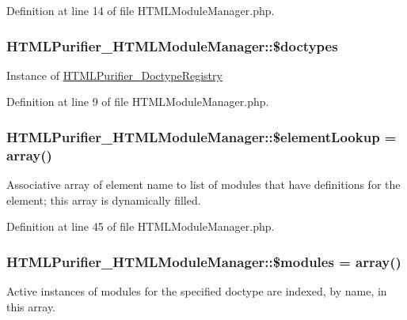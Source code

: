 Definition at line 14 of file H\+T\+M\+L\+Module\+Manager.\+php.

\hypertarget{classHTMLPurifier__HTMLModuleManager_a94b1b82d8a2873995d6f0e7348e960d0}{
\subsubsection[{\$doctypes}]{\setlength{\rightskip}{0pt plus 5cm}H\+T\+M\+L\+Purifier\+\_\+\+H\+T\+M\+L\+Module\+Manager\+::\$doctypes}}\label{classHTMLPurifier__HTMLModuleManager_a94b1b82d8a2873995d6f0e7348e960d0}
Instance of \hyperlink{classHTMLPurifier__DoctypeRegistry}{H\+T\+M\+L\+Purifier\+\_\+\+Doctype\+Registry} 

Definition at line 9 of file H\+T\+M\+L\+Module\+Manager.\+php.

\hypertarget{classHTMLPurifier__HTMLModuleManager_a9e6c47d3f347bb0d09116b4ac5fce29e}{
\subsubsection[{\$element\+Lookup}]{\setlength{\rightskip}{0pt plus 5cm}H\+T\+M\+L\+Purifier\+\_\+\+H\+T\+M\+L\+Module\+Manager\+::\$element\+Lookup = array()}}\label{classHTMLPurifier__HTMLModuleManager_a9e6c47d3f347bb0d09116b4ac5fce29e}
Associative array of element name to list of modules that have definitions for the element; this array is dynamically filled. 

Definition at line 45 of file H\+T\+M\+L\+Module\+Manager.\+php.

\hypertarget{classHTMLPurifier__HTMLModuleManager_a1dad6984fd384aa80f545c0323e8b18f}{
\subsubsection[{\$modules}]{\setlength{\rightskip}{0pt plus 5cm}H\+T\+M\+L\+Purifier\+\_\+\+H\+T\+M\+L\+Module\+Manager\+::\$modules = array()}}\label{classHTMLPurifier__HTMLModuleManager_a1dad6984fd384aa80f545c0323e8b18f}
Active instances of modules for the specified doctype are indexed, by name, in this array. 

